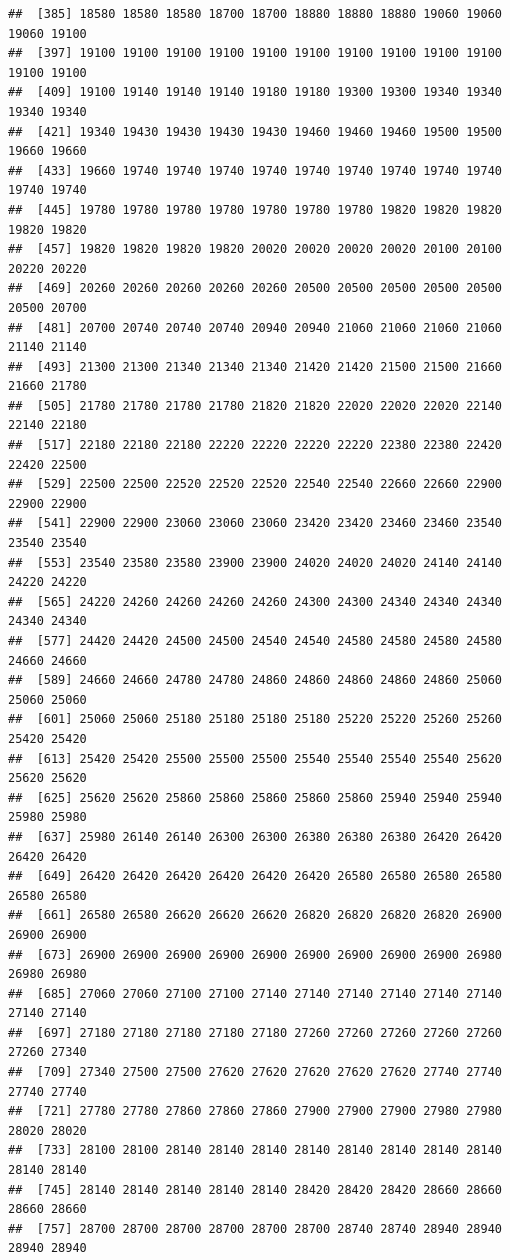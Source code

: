 \documentclass[
  12pt,
]{article}
\begin{document}
\begin{verbatim}
##  [385] 18580 18580 18580 18700 18700 18880 18880 18880 19060 19060 19060 19100
##  [397] 19100 19100 19100 19100 19100 19100 19100 19100 19100 19100 19100 19100
##  [409] 19100 19140 19140 19140 19180 19180 19300 19300 19340 19340 19340 19340
##  [421] 19340 19430 19430 19430 19430 19460 19460 19460 19500 19500 19660 19660
##  [433] 19660 19740 19740 19740 19740 19740 19740 19740 19740 19740 19740 19740
##  [445] 19780 19780 19780 19780 19780 19780 19780 19820 19820 19820 19820 19820
##  [457] 19820 19820 19820 19820 20020 20020 20020 20020 20100 20100 20220 20220
##  [469] 20260 20260 20260 20260 20260 20500 20500 20500 20500 20500 20500 20700
##  [481] 20700 20740 20740 20740 20940 20940 21060 21060 21060 21060 21140 21140
##  [493] 21300 21300 21340 21340 21340 21420 21420 21500 21500 21660 21660 21780
##  [505] 21780 21780 21780 21780 21820 21820 22020 22020 22020 22140 22140 22180
##  [517] 22180 22180 22180 22220 22220 22220 22220 22380 22380 22420 22420 22500
##  [529] 22500 22500 22520 22520 22520 22540 22540 22660 22660 22900 22900 22900
##  [541] 22900 22900 23060 23060 23060 23420 23420 23460 23460 23540 23540 23540
##  [553] 23540 23580 23580 23900 23900 24020 24020 24020 24140 24140 24220 24220
##  [565] 24220 24260 24260 24260 24260 24300 24300 24340 24340 24340 24340 24340
##  [577] 24420 24420 24500 24500 24540 24540 24580 24580 24580 24580 24660 24660
##  [589] 24660 24660 24780 24780 24860 24860 24860 24860 24860 25060 25060 25060
##  [601] 25060 25060 25180 25180 25180 25180 25220 25220 25260 25260 25420 25420
##  [613] 25420 25420 25500 25500 25500 25540 25540 25540 25540 25620 25620 25620
##  [625] 25620 25620 25860 25860 25860 25860 25860 25940 25940 25940 25980 25980
##  [637] 25980 26140 26140 26300 26300 26380 26380 26380 26420 26420 26420 26420
##  [649] 26420 26420 26420 26420 26420 26420 26580 26580 26580 26580 26580 26580
##  [661] 26580 26580 26620 26620 26620 26820 26820 26820 26820 26900 26900 26900
##  [673] 26900 26900 26900 26900 26900 26900 26900 26900 26900 26980 26980 26980
##  [685] 27060 27060 27100 27100 27140 27140 27140 27140 27140 27140 27140 27140
##  [697] 27180 27180 27180 27180 27180 27260 27260 27260 27260 27260 27260 27340
##  [709] 27340 27500 27500 27620 27620 27620 27620 27620 27740 27740 27740 27740
##  [721] 27780 27780 27860 27860 27860 27900 27900 27900 27980 27980 28020 28020
##  [733] 28100 28100 28140 28140 28140 28140 28140 28140 28140 28140 28140 28140
##  [745] 28140 28140 28140 28140 28140 28420 28420 28420 28660 28660 28660 28660
##  [757] 28700 28700 28700 28700 28700 28700 28740 28740 28940 28940 28940 28940

\end{verbatim}
\end{document}
